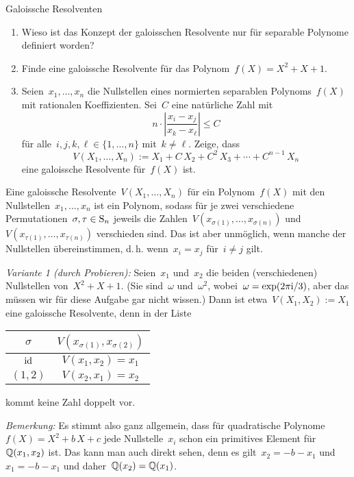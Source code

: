 \documentclass{algblatt}
\begin{document}
\begin{aufgabe}{Galoissche Resolventen}
\begin{enumerate}
\item Wieso ist das Konzept der galoisschen Resolvente nur für separable
Polynome definiert worden?

\item Finde eine galoissche Resolvente für das Polynom~$f(X) = X^2 + X + 1$.

\item Seien~$x_1,\ldots,x_n$ die Nullstellen eines normierten separablen
Polynoms~$f(X)$ mit rationalen Koeffizienten. Sei~$C$ eine natürliche Zahl mit
\[ n \cdot \left|\frac{x_i - x_j}{x_k - x_\ell}\right| \leq C \]
für alle~$i,j,k,\ell \in \{ 1,\ldots,n \}$ mit~$k \neq \ell$. Zeige, dass
\[ V(X_1,\ldots,X_n) := X_1 + C\,X_2 + C^2\,X_3 + \cdots + C^{n-1}\,X_n \]
eine galoissche Resolvente für~$f(X)$ ist.
\end{enumerate}

\begin{loesungE}
\item Eine galoissche Resolvente~$V(X_1,\ldots,X_n)$ für ein Polynom~$f(X)$ mit
den Nullstellen~$x_1,\ldots,x_n$ ist ein Polynom, sodass für je zwei
verschiedene Permutationen~$\sigma,\tau \in \mathrm{S}_n$ jeweils die
Zahlen~$V(x_{\sigma(1)},\ldots,x_{\sigma(n)})$
und~$V(x_{\tau(1)},\ldots,x_{\tau(n)})$ verschieden sind. Das ist aber
unmöglich, wenn manche der Nullstellen übereinstimmen, d.\,h. wenn~$x_i = x_j$
für~$i \neq j$ gilt.

\item \emph{Variante 1 (durch Probieren):} Seien~$x_1$ und~$x_2$ die beiden
(verschiedenen) Nullstellen von~$X^2 + X + 1$.
(Sie sind~$\omega$ und~$\omega^2$, wobei~$\omega =
\exp(2\pi\mathrm{i}/3)$, aber das müssen wir für diese Aufgabe gar nicht wissen.) Dann
ist etwa~$V(X_1,X_2) := X_1$ eine galoissche Resolvente,
denn in der Liste
\begin{center}
  \begin{tabular}{c|c}
    $\sigma$ & $V(x_{\sigma(1)}, x_{\sigma(2)})$ \\\hline
    $\mathrm{id}$ & $V(x_1,x_2) = x_1$ \\
    $(1,2)$ & $V(x_2,x_1) = x_2$
  \end{tabular}
\end{center}
kommt keine Zahl doppelt vor.

\emph{Bemerkung:} Es stimmt also ganz allgemein, dass für quadratische
Polynome~$f(X) = X^2 + b\,X + c$ jede Nullstelle~$x_i$ schon ein primitives
Element für~$\mathbb{Q}(x_1,x_2)$ ist. Das kann man auch direkt sehen, denn es
gilt~$x_2 = -b - x_1$ und~$x_1 = -b - x_1$ und daher~$\mathbb{Q}(x_2) = \mathbb{Q}(x_1)$.


\end{loesungE}
\end{aufgabe}
\end{document}
